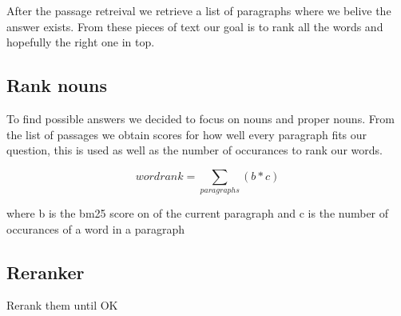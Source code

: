 After the passage retreival we retrieve a list of paragraphs where we belive the answer exists. 
From these pieces of text our goal is to rank all the words and hopefully the right one in top.

\subsection{Rank nouns}

To find possible answers we decided to focus on nouns and proper nouns. 
From the list of passages we obtain scores for how well every paragraph fits our question, 
this is used as well as the number of occurances to rank our words.

\[ wordrank = \sum_{paragraphs}(b*c) \]

where b is the bm25 score on of the current paragraph and c is the number of occurances of a word in a paragraph

\subsection{Reranker}

Rerank them until OK